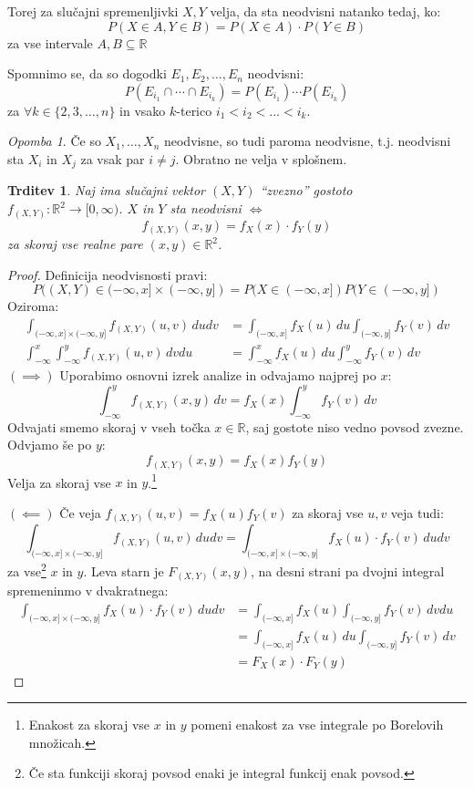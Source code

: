 \documentclass[12pt]{book}
\def\n{\noindent}
\theoremstyle{definition}
\theoremstyle{plain}
\theoremstyle{plain}
\newtheorem{trditev}{Trditev}
\theoremstyle{plain}
\theoremstyle{plain}
\theoremstyle{remark}
\newtheorem*{opomba}{Opomba}
\begin{document}
\n Torej za slučajni spremenljivki $X, Y$ velja, da sta neodvisni natanko tedaj, ko: 
$$
P(X \in A, Y \in B)=P(X \in A) \cdot P(Y \in B)
$$
za vse intervale $A,B \subseteq \mathbb{R}$

\n Spomnimo se, da so dogodki $E_1, E_2, \ldots , E_n$ neodvisni:
$$
P\left(E_{i_1} \cap \cdots \cap E_{i_k}\right)=P\left(E_{i_1}\right) \cdots P\left(E_{i_k}\right)
$$
za $\forall k \in \{2, 3, \ldots, n\}$ in vsako $k$-terico $i_1<i_2<\ldots<i_k$.

\begin{opomba}
    Če so $X_1, \ldots, X_n$ neodvisne, so tudi paroma neodvisne, t.j. neodvisni sta $X_i$ in $X_j$ za vsak par $i \neq j$. Obratno ne velja v splošnem. 
\end{opomba}

\begin{trditev}
    Naj ima slučajni vektor $(X,Y)$ “zvezno” gostoto $f_{(X,Y)}:\mathbb{R}^2 \to [0, \infty)$. $X$ in $Y$ sta neodvisni $\iff$
    $$
    f_{(X, Y)}(x, y)=f_X(x) \cdot f_Y(y)
    $$
    za skoraj vse realne pare $(x,y) \in \mathbb{R}^2$.
\end{trditev}

\begin{proof}
    Definicija neodvisnosti pravi: 
    $$
    P((X, Y) \in(-\infty, x] \times(-\infty, y])=P(X \in(-\infty, x]) P(Y \in(-\infty, y])
    $$
    Oziroma: 
    $$
    \begin{aligned}
      \int_{(-\infty, x] \times(-\infty, y]} f_{(X, Y)}(u, v) \, d u d v&=\int_{(-\infty, x]} f_X(u) \, d u \int_{(-\infty, y]} f_Y(v) \, d v  \\
      \int_{-\infty}^x \int_{-\infty}^y f_{(X, Y)}(u, v) \, d v d u&=\int_{-\infty}^x f_X(u) \, d u \int_{-\infty}^y f_Y(v) \, d v
    \end{aligned}
    $$
    $(\implies)$ Uporabimo osnovni izrek analize in odvajamo najprej po $x$:
    $$
    \int_{-\infty}^y f_{(X, Y)}(x, y) \, d v=f_X(x) \int_{-\infty}^y f_Y(v) \, d v
    $$
    Odvajati smemo skoraj v vseh točka $x \in \mathbb{R}$, saj gostote niso vedno povsod zvezne. Odvjamo še po $y$: 
    $$
    f_{(X, Y)}(x, y)=f_X(x) f_Y(y)
    $$
    Velja za skoraj vse $x$ in $y$.\footnote[3]{Enakost za skoraj vse $x$ in $y$ pomeni enakost za vse integrale po Borelovih množicah.}

    \n $(\impliedby)$ Če veja $f_{(X, Y)}(u, v)=f_X(u) f_Y(v)$ za skoraj vse $u,v$ veja tudi: 
    $$
    \int_{(-\infty, x] \times(-\infty, y]} f_{(X, Y)}(u, v) \, d u d v=\int_{(-\infty, x] \times(-\infty, y]} f_X(u) \cdot f_Y(v) \, d u d v
    $$
    za vse\footnote[4]{Če sta funkciji skoraj povsod enaki je integral funkcij enak povsod.} $x$ in $y$. Leva starn je $F_{(X,Y)}(x,y)$, na desni strani pa dvojni integral spremeninmo v dvakratnega: 
    $$
    \begin{aligned}
        \int_{(-\infty, x] \times(-\infty, y]} f_X(u) \cdot f_Y(v) \, d u d v &= \int_{(-\infty, x]} f_X(u) \int_{(-\infty, y]} f_Y(v) \, d v d u\\
        &=\int_{(-\infty, x]} f_X(u) \, d u \int_{(-\infty, y]} f_Y(v) \, d v \\
        &= F_X(x) \cdot F_Y(y)
    \end{aligned}
    $$
\end{proof}
\end{document}

